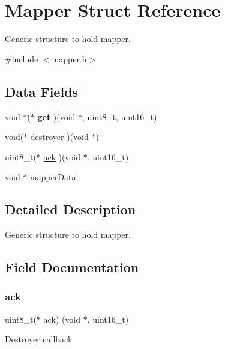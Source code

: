 \hypertarget{struct_mapper}{}\section{Mapper Struct Reference}
\label{struct_mapper}


Generic structure to hold mapper.  




{\ttfamily \#include $<$mapper.\+h$>$}

\subsection*{Data Fields}
\begin{DoxyCompactItemize}
\item 
\mbox{\label{struct_mapper_a2ec355646dbdcfd7f762b06a233067d5}} 
void $\ast$($\ast$ {\bfseries get} )(void $\ast$, uint8\+\_\+t, uint16\+\_\+t)
\item 
void($\ast$ \hyperlink{struct_mapper_a6d5022ea505e6c2ce03eee79a76c0c49}{destroyer} )(void $\ast$)
\item 
uint8\+\_\+t($\ast$ \hyperlink{struct_mapper_a30f4bc8c14f8ed6b602d081e28e387a5}{ack} )(void $\ast$, uint16\+\_\+t)
\item 
void $\ast$ \hyperlink{struct_mapper_a417be0ec6d49a8fade0fa596656d1d43}{mapper\+Data}
\end{DoxyCompactItemize}


\subsection{Detailed Description}
Generic structure to hold mapper. 

\subsection{Field Documentation}
\mbox{\label{struct_mapper_a30f4bc8c14f8ed6b602d081e28e387a5}} 
\subsubsection{\texorpdfstring{ack}{ack}}
{\footnotesize\ttfamily uint8\+\_\+t($\ast$ ack) (void $\ast$, uint16\+\_\+t)}

Destroyer callback \mbox{\label{struct_mapper_a6d5022ea505e6c2ce03eee79a76c0c49}} 
